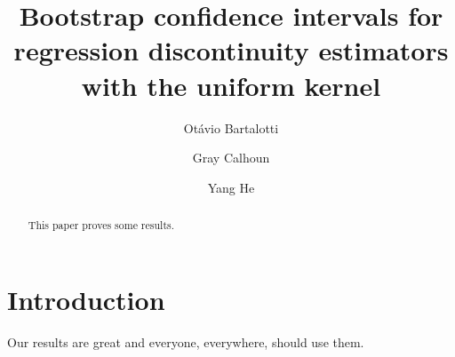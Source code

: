 \documentclass[12pt,fleqn]{article}
\title{Bootstrap confidence intervals for regression discontinuity estimators
  with the uniform kernel}
\author{Ot\'avio Bartalotti \and Gray Calhoun \and Yang He}
\begin{document}
\maketitle

\begin{abstract}
This paper proves some results.
\end{abstract}

\section{Introduction}

Our results are great and everyone, everywhere, should use them.
\end{document}
